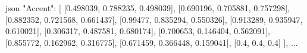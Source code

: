 \documentclass{tutodoc}
\begin{document}
\begin{tdoccode}{json}
{
  "Accent": [
    [0.498039, 0.788235, 0.498039],
    [0.690196, 0.705881, 0.757298],
    [0.882352, 0.721568, 0.661437],
    [0.99477, 0.835294, 0.550326],
    [0.913289, 0.935947, 0.610021],
    [0.306317, 0.487581, 0.680174],
    [0.700653, 0.146404, 0.562091],
    [0.855772, 0.162962, 0.316775],
    [0.671459, 0.366448, 0.159041],
    [0.4, 0.4, 0.4]
  ],
  ...
}
\end{tdoccode}

\end{document}
